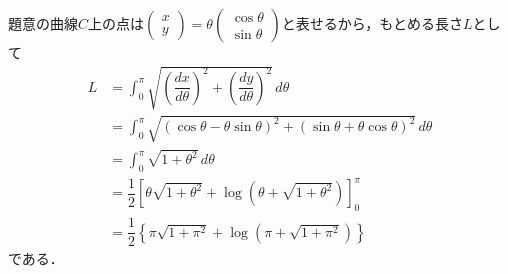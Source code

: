 \documentclass[../../main.tex]{subfiles}
\begin{document}
題意の曲線$C$上の点は$
\begin{pmatrix}x\\y
\end{pmatrix}=\theta
\begin{pmatrix}\cos\theta\\\sin\theta
\end{pmatrix}$と表せるから，もとめる長さ$L$として
\begin{align}
  L&=\int_0^\pi\sqrt{\left(\dfrac{dx}{d\theta}\right)^2+\left(\dfrac{dy}{d\theta}\right)^2}\,d\theta\\
  &=\int_0^\pi\sqrt{(\cos\theta-\theta\sin\theta)^2+(\sin\theta+\theta\cos\theta)^2}\,d\theta\\
  &=\int_0^\pi\sqrt{1+\theta^2}\,d\theta\\
  &=\dfrac{1}{2}\left[\theta\sqrt{1+\theta^2}+\log\left(\theta+\sqrt{1+\theta^2}\right)\right]_0^\pi\\
  &=\dfrac{1}{2}\left\{\pi\sqrt{1+\pi^2}+\log\left(\pi+\sqrt{1+\pi^2}\right)\right\}
\end{align}
である．

\newpage
\end{document}
